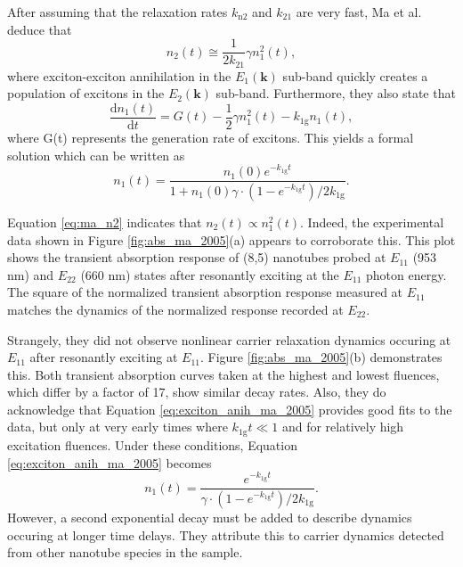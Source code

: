 After assuming that the relaxation rates $k_\text{n2}$ and $k_\text{21}$ are very fast, Ma et al. deduce that
\begin{equation}
	n_2(t) \cong \frac{1}{2 k_{21}} \gamma n^2_1(t),
	\label{eq:ma_n2}
\end{equation}
where exciton-exciton annihilation in the $E_1(\mathbf{k})$ sub-band quickly creates a population of excitons in the $E_2(\mathbf{k})$ sub-band. Furthermore, they also state that
\begin{equation}
\frac{\mathrm{d} n_1(t)}{\mathrm{d}t} = G(t) - \frac{1}{2}\gamma n_1^2(t) - k_\text{1g} n_1(t),
\end{equation}
where G(t) represents the generation rate of excitons.  This yields a formal solution which can be written as
%
\begin{equation}
	n_1(t) = \frac{n_1(0)e^{-k_\text{1g}t}}{1 + n_1(0) \gamma\cdot(1 - e^{-k_\text{1g}t} )/2k_\text{1g}}.
	\label{eq:exciton_anih_ma_2005}
\end{equation}
%

Equation \eqref{eq:ma_n2} indicates that $n_2(t) \propto n_1^2(t)$. Indeed, the experimental data shown in Figure \ref{fig:abs_ma_2005}(a) appears to corroborate this. This plot shows the transient absorption response of (8,5) nanotubes probed at $E_{11}$ (953 nm) and $E_{22}$ (660 nm) states after resonantly exciting at the $E_{11}$ photon energy. The square of the normalized transient absorption response measured at $E_{11}$ matches the dynamics of the normalized response recorded at $E_{22}$.

Strangely, they did not observe nonlinear carrier relaxation dynamics occuring at $E_{11}$ after resonantly exciting at $E_{11}$. Figure \ref{fig:abs_ma_2005}(b) demonstrates this. Both transient absorption curves taken at the highest and lowest fluences, which differ by a factor of 17, show similar decay rates. Also, they do acknowledge that Equation \eqref{eq:exciton_anih_ma_2005} provides good fits to the data, but only at very early times where $k_\text{1g} t \ll 1$ and for relatively high excitation fluences. Under these conditions, Equation \eqref{eq:exciton_anih_ma_2005} becomes
\begin{equation}
		n_1(t) = \frac{e^{-k_\text{1g}t}}{\gamma\cdot(1 - e^{-k_\text{1g}t} )/2k_\text{1g}}.
\end{equation}
However, a second exponential decay must be added to describe dynamics occuring at longer time delays. They attribute this to carrier dynamics detected from other nanotube species in the sample.

